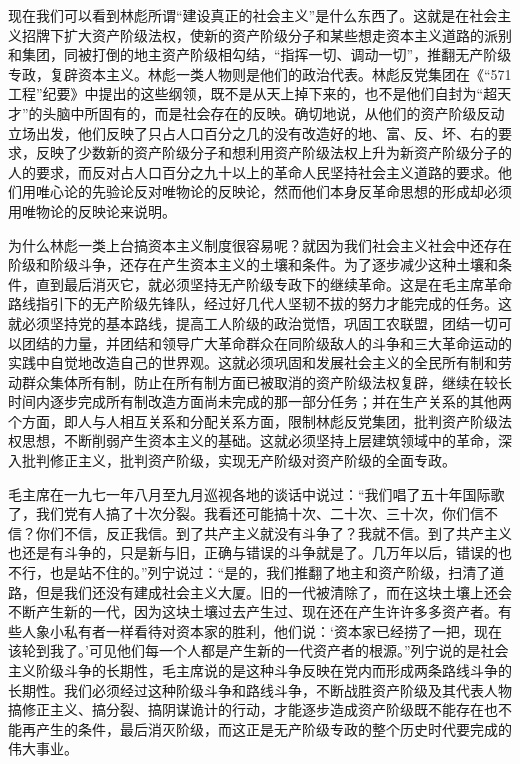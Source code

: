 \begin{maonote}
现在我们可以看到林彪所谓“建设真正的社会主义”是什么东西了。这就是在社会主义招牌下扩大资产阶级法权，使新的资产阶级分子和某些想走资本主义道路的派别和集团，同被打倒的地主资产阶级相勾结，“指挥一切、调动一切”，推翻无产阶级专政，复辟资本主义。林彪一类人物则是他们的政治代表。林彪反党集团在《“571工程”纪要》中提出的这些纲领，既不是从天上掉下来的，也不是他们自封为“超天才”的头脑中所固有的，而是社会存在的反映。确切地说，从他们的资产阶级反动立场出发，他们反映了只占人口百分之几的没有改造好的地、富、反、坏、右的要求，反映了少数新的资产阶级分子和想利用资产阶级法权上升为新资产阶级分子的人的要求，而反对占人口百分之九十以上的革命人民坚持社会主义道路的要求。他们用唯心论的先验论反对唯物论的反映论，然而他们本身反革命思想的形成却必须用唯物论的反映论来说明。

为什么林彪一类上台搞资本主义制度很容易呢？就因为我们社会主义社会中还存在阶级和阶级斗争，还存在产生资本主义的土壤和条件。为了逐步减少这种土壤和条件，直到最后消灭它，就必须坚持无产阶级专政下的继续革命。这是在毛主席革命路线指引下的无产阶级先锋队，经过好几代人坚韧不拔的努力才能完成的任务。这就必须坚持党的基本路线，提高工人阶级的政治觉悟，巩固工农联盟，团结一切可以团结的力量，并团结和领导广大革命群众在同阶级敌人的斗争和三大革命运动的实践中自觉地改造自己的世界观。这就必须巩固和发展社会主义的全民所有制和劳动群众集体所有制，防止在所有制方面已被取消的资产阶级法权复辟，继续在较长时间内逐步完成所有制改造方面尚未完成的那一部分任务；并在生产关系的其他两个方面，即人与人相互关系和分配关系方面，限制林彪反党集团，批判资产阶级法权思想，不断削弱产生资本主义的基础。这就必须坚持上层建筑领域中的革命，深入批判修正主义，批判资产阶级，实现无产阶级对资产阶级的全面专政。

毛主席在一九七一年八月至九月巡视各地的谈话中说过：“我们唱了五十年国际歌了，我们党有人搞了十次分裂。我看还可能搞十次、二十次、三十次，你们信不信？你们不信，反正我信。到了共产主义就没有斗争了？我就不信。到了共产主义也还是有斗争的，只是新与旧，正确与错误的斗争就是了。几万年以后，错误的也不行，也是站不住的。”列宁说过：“是的，我们推翻了地主和资产阶级，扫清了道路，但是我们还没有建成社会主义大厦。旧的一代被清除了，而在这块土壤上还会不断产生新的一代，因为这块土壤过去产生过、现在还在产生许许多多资产者。有些人象小私有者一样看待对资本家的胜利，他们说：‘资本家已经捞了一把，现在该轮到我了。’可见他们每一个人都是产生新的一代资产者的根源。”列宁说的是社会主义阶级斗争的长期性，毛主席说的是这种斗争反映在党内而形成两条路线斗争的长期性。我们必须经过这种阶级斗争和路线斗争，不断战胜资产阶级及其代表人物搞修正主义、搞分裂、搞阴谋诡计的行动，才能逐步造成资产阶级既不能存在也不能再产生的条件，最后消灭阶级，而这正是无产阶级专政的整个历史时代要完成的伟大事业。


\end{maonote}
